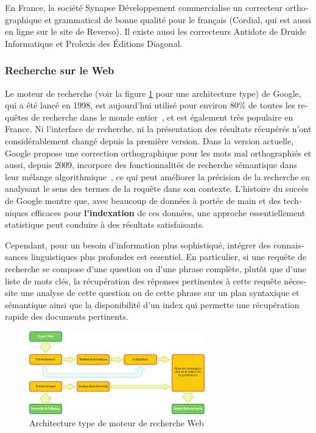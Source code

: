 \begin{french}
\begin{multicols}{2}
En France, la société Synapse Développement commercialise un
correcteur orthographique et grammatical de bonne qualité pour le
français (Cordial, qui est aussi en ligne sur le site de Reverso). Il
existe aussi les correcteurs Antidote de Druide Informatique et
Prolexis des Éditions Diagonal.

\subsubsection{Recherche sur le Web}
Le moteur de recherche (voir la figure \ref{fig:archiweb} pour une
architecture type) de Google, qui a été lancé en 1998, est aujourd{\mbox '}hui 
utilisé pour environ 80\% de toutes les requêtes de recherche
dans le monde entier~\cite{googleworld}, et est également très
populaire en France. Ni l{\mbox '}interface de recherche, ni la présentation
des résultats récupérés n{\mbox '}ont considérablement changé depuis la
première version. Dans la version actuelle, Google propose une
correction orthographique pour les mots mal orthographiés et aussi,
depuis 2009, incorpore des fonctionnalités de recherche sémantique
dans leur mélange algorithmique~\cite{googlesemantics}, ce qui peut
améliorer la précision de la recherche en analysant le sens des termes
de la requête dans son contexte. L{\mbox '}histoire du succès de Google montre
que, avec beaucoup de données à portée de main et des techniques
efficaces pour {\bf l{\mbox '}indexation} de ces données, une approche
essentiellement statistique peut conduire à des résultats
satisfaisants.

Cependant, pour un besoin d{\mbox '}information plus sophistiqué, intégrer des
connaissances linguistiques plus profondes est essentiel. En
particulier, si une requête de recherche se compose d{\mbox '}une question ou
d{\mbox '}une phrase complète, plutôt que d{\mbox '}une liste de mots clés, la
récupération des réponses pertinentes à cette requête nécessite une
analyse de cette question ou de cette phrase sur un plan syntaxique et
sémantique ainsi que la disponibilité d{\mbox '}un index qui permette une
récupération rapide des documents pertinents.

\begin{figure}[!ht]
\begin{center}
 \includegraphics[width=3.0in]{../_media/french/web_search_architecture}
 \caption{Architecture type de moteur de recherche Web}
\label{fig:archiweb}
\end{center}
\end{figure}


\end{multicols}
\end{french}
